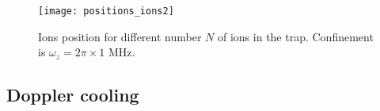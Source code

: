 \begin{figure}[H]
\centering
\texttt{[image: positions\_ions2]}
\caption{Ions position for different number $N$ of ions in the trap. Confinement is $\omega_z = 2\pi\times 1$ MHz.}
\label{positions_ions}
\end{figure}
%
%
\subsection{Doppler cooling}
\label{sec:doppler_cooling}


